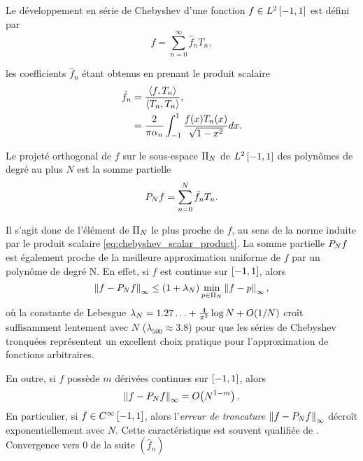 Le développement en série de Chebyshev d'une fonction $f \in \Ltwospace$ est défini par
\begin{equation}
	f = \sum_{n=0}^{\infty} \hat{f}_n T_n,
	\label{eq:chebyshev_series}
\end{equation}

les coefficients $\hat{f}_n$ étant obtenus en prenant le produit scalaire
\begin{align}
	\hat{f}_n 
	&= \frac{\scalprod{f}{T_n}}{\scalprod{T_n}{T_n}}, \nonumber \\
	&= \frac{2}{\pi \alpha_n} \int_{-1}^{1} \frac{f(x) T_n(x)}{\sqrt{1 - x^2}} dx.
	\label{eq:chebyshev_series_coeffs}
\end{align}

Le projeté orthogonal de $f$ sur le sous-espace $\polyspace{N}$ de $\Ltwospace$ des polynômes de degré au plus $N$ est la somme partielle%
\begin{equation}
	\truncseries{f}{N} = \sum_{n=0}^{N} \hat{f}_n T_n.
	\label{chebyshev_truncated_series}
\end{equation}

Il s'agit donc de l'élément de $\polyspace{N}$ le plus proche de $f$, au sens de la norme induite par le produit scalaire \eqref{eq:chebyshev_scalar_product}.
La somme partielle $\truncseries{f}{N}$ est également proche de la meilleure approximation uniforme de $f$ par un polynôme de degré N. En effet, si $f$ est continue sur $\chebinterval$, alors
\begin{equation}
	\norminf{f - \truncseries{f}{N}} 
	\leq 
	\left(1 + \lambda_N \right) 
	\min_{p \in \polyspace{N}} \norminf{f - p},
	\label{eq:chebyshev_near_minimax}
\end{equation}
où la constante de Lebesgue $\lambda_N = 1.27\ldots + \frac{4}{\pi^2} \log N + \bigO{1/N}$ croît suffisamment lentement avec $N$ ($\lambda_{500} \approx 3.8$) pour que les séries de Chebyshev tronquées représentent un excellent choix pratique pour l'approximation de fonctions arbitraires.\par
En outre, si $f$ possède $m$ dérivées continues sur $\chebinterval$, alors
\begin{equation}
	\norminf{f - \truncseries{f}{N}} = \bigO{N^{1-m}}.
	\label{eq:chebyshev_spectral_accuracy}
\end{equation}
En particulier, si $f \in C^{\infty}\chebinterval$, alors l'\textit{erreur de troncature} $\norminf{f - \truncseries{f}{N}}$ décroît exponentiellement avec $N$. 
Cette caractéristique est souvent qualifiée de .\\
Convergence vers 0 de la suite $(\hat{f}_n)$
\par\bigskip

